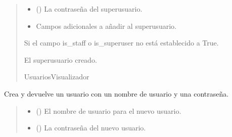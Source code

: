 \documentclass[letterpaper,10pt,spanish]{sphinxmanual}
\begin{document}
\begin{fulllineitems}
\begin{fulllineitems}
\begin{quote}
\begin{description}
\begin{itemize}
\item {} 
\sphinxAtStartPar
{} (\sphinxstyleliteralemphasis{\sphinxupquote{, }}) \textendash{} La contraseña del superusuario.

\item {} 
\sphinxAtStartPar
{} \textendash{} Campos adicionales a añadir al superusuario.

\end{itemize}

\sphinxAtStartPar
{} \textendash{} Si el campo is\_staff o is\_superuser no está establecido a True.

\sphinxAtStartPar
El superusuario creado.

\sphinxAtStartPar
UsuariosVisualizador

\end{description}\end{quote}

\end{fulllineitems}



\begin{fulllineitems}

\pysigstartsignatures
{}
\pysigstopsignatures
\sphinxAtStartPar
Crea y devuelve un usuario con un nombre de usuario y una contraseña.
\begin{quote}\begin{description}
\begin{itemize}
\item {} 
\sphinxAtStartPar
{} () \textendash{} El nombre de usuario para el nuevo usuario.

\item {} 
\sphinxAtStartPar
{} (\sphinxstyleliteralemphasis{\sphinxupquote{, }}) \textendash{} La contraseña del nuevo usuario.


\end{itemize}
\end{description}
\end{quote}
\end{fulllineitems}
\end{fulllineitems}
\end{document}
